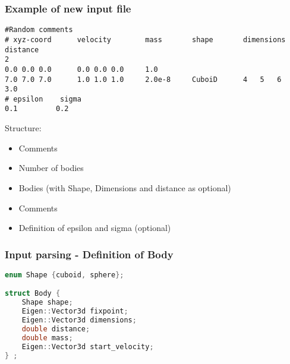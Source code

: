 

\begin{frame}[fragile]
\frametitle{Example of new input file}

 \begin{Verbatim}
#Random comments
# xyz-coord      velocity        mass       shape       dimensions      distance  
2
0.0 0.0 0.0      0.0 0.0 0.0     1.0
7.0 7.0 7.0      1.0 1.0 1.0     2.0e-8     CuboiD      4	5	6         3.0
# epsilon    sigma
0.1         0.2
 \end{Verbatim}

\vspace{-0.5cm}
\large
Structure:
\vspace{-0.7cm}
\begin{itemize}
	\item<1-> Comments
	\item<1-> Number of bodies
	\item<2-> Bodies (with Shape, Dimensions and distance as optional)
	\item<3-> Comments
	\item<4- > Definition of epsilon and sigma (optional)
\end{itemize}

\end{frame}


\begin{frame}[fragile]
\frametitle{Input parsing - Definition of Body}
\vspace{0.7cm}

\begin{lstlisting}[language=C++]
enum Shape {cuboid, sphere};

struct Body {
	Shape shape;   
	Eigen::Vector3d fixpoint; 
	Eigen::Vector3d dimensions; 
	double distance;
	double mass;
	Eigen::Vector3d start_velocity;
} ;
\end{lstlisting}
	
\end{frame}


